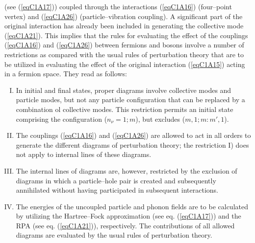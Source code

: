(see (\ref{eqC1A17})) coupled through the interactions (\ref{eqC1A16}) (four--point vertex) and (\ref{eqC1A26}) (particle--vibration coupling). A significant
part of the original interaction has already been included in generating the
collective mode (\ref{eqC1A21}). This implies that the rules for evaluating the effect of
the couplings (\ref{eqC1A16}) and (\ref{eqC1A26}) between fermions and bosons involve a number of restrictions as compared with the usual rules of perturbation theory that
are to be utilized in evaluating the effect of the original interaction (\ref{eqC1A15}) acting
in a fermion space. They read as follows:
\begin{enumerate}[I)]
\item In initial and final states, proper diagrams involve collective modes
and particle modes, but not any particle configuration that can be replaced by
a combination ol collective modes. This restriction permits an initial state
comprising the configuration ($n_\nu =1;m$), but excludes ($m, 1; m: m',1$).
\item The couplings (\ref{eqC1A16}) and (\ref{eqC1A26}) are allowed to act in all orders to
generate the different diagrams of perturbation theory; the restriction I) does
not apply to internal lines of these diagrams.
\item The internal lines of diagrams are, however, restricted by the exclusion of diagrams in which a particle--hole pair is created and subsequently
annihilated without having participated in subsequent interactions.
\item The energies of the uncoupled particle and phonon fields are to be
calculated by utilizing the Hartree--Fock approximation (see eq. (\ref{eqC1A17})) and the
RPA (see eq. (\ref{eqC1A21})), respectively. The contributions of all allowed diagrams are
evaluated by the usual rules of perturbation theory.
\end{enumerate}

